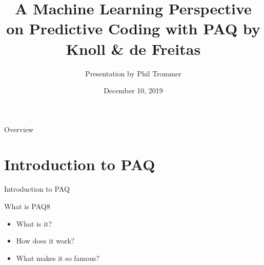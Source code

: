 \documentclass[11pt,usenames,dvipsnames]{beamer}
\author{Presentation by Phil Trommer}
\title{A Machine Learning Perspective on Predictive Coding with PAQ by Knoll \& de Freitas}
\date{December 10, 2019}
\begin{document}
\begin{frame}
\titlepage
\end{frame}


\begin{frame}{Overview}
\tableofcontents
\end{frame}


\section{Introduction to PAQ}


\begin{frame}{Introduction to PAQ}
	\begin{block}{What is PAQ8}
			\begin{itemize}
				\item What is it?
				\item How does it work?
				\item What makes it so famous?
			\end{itemize}
	\end{block}
\end{frame}
\end{document}

